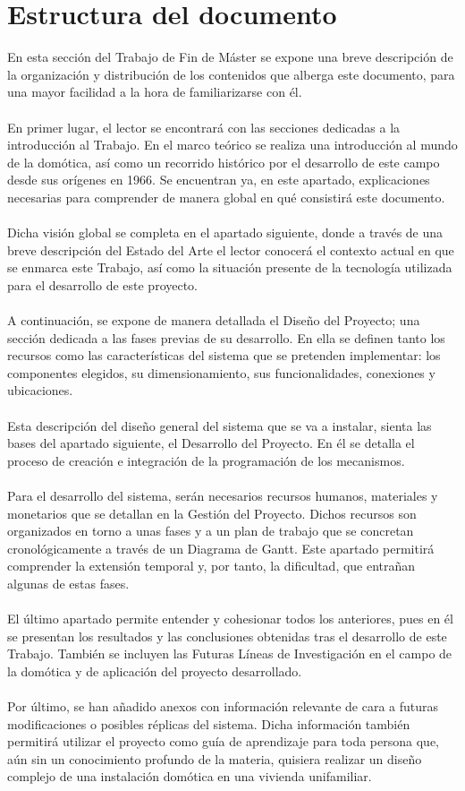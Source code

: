 \section{Estructura del documento}

En esta sección del Trabajo de Fin de Máster se expone una breve descripción de la organización y distribución de los contenidos que alberga este documento, para una mayor facilidad a la hora de familiarizarse con él.\\\\
En primer lugar, el lector se encontrará con las secciones dedicadas a la introducción al Trabajo. En el marco teórico se realiza una introducción al mundo de la domótica, así como un recorrido histórico por el desarrollo de este campo desde sus orígenes en 1966. Se encuentran ya, en este apartado, explicaciones necesarias para comprender de manera global en qué consistirá este documento. \\\\
Dicha visión global se completa en el apartado siguiente, donde a través de una breve descripción del Estado del Arte el lector conocerá el contexto actual en que se enmarca este Trabajo, así como la situación presente de la tecnología utilizada para el desarrollo de este proyecto.\\\\
A continuación, se expone de manera detallada el Diseño del Proyecto; una sección dedicada a las fases previas de su desarrollo. En ella se definen tanto los recursos como las características del sistema que se pretenden implementar: los componentes elegidos, su dimensionamiento, sus funcionalidades, conexiones y ubicaciones.\\\\
Esta descripción del diseño general del sistema que se va a instalar, sienta las bases del apartado siguiente, el Desarrollo del Proyecto. En él se detalla el proceso de creación e integración de la programación de los mecanismos. \\\\
Para el desarrollo del sistema, serán necesarios recursos humanos, materiales y monetarios que se detallan en la Gestión del Proyecto. Dichos recursos son organizados en torno a unas fases y a un plan de trabajo que se concretan cronológicamente a través de un Diagrama de Gantt. Este apartado permitirá comprender la extensión temporal y, por tanto, la dificultad, que entrañan algunas de estas fases.\\\\
El último apartado permite entender y cohesionar todos los anteriores, pues en él se presentan los resultados y las conclusiones obtenidas tras el desarrollo de este Trabajo. También se incluyen las Futuras Líneas de Investigación en el campo de la domótica y de aplicación del proyecto desarrollado.\\\\
Por último, se han añadido anexos con información relevante de cara a futuras modificaciones o posibles réplicas del sistema. Dicha información también permitirá utilizar el proyecto como guía de aprendizaje para toda persona que, aún sin un conocimiento profundo de la materia, quisiera realizar un diseño complejo de una instalación domótica en una vivienda unifamiliar.
